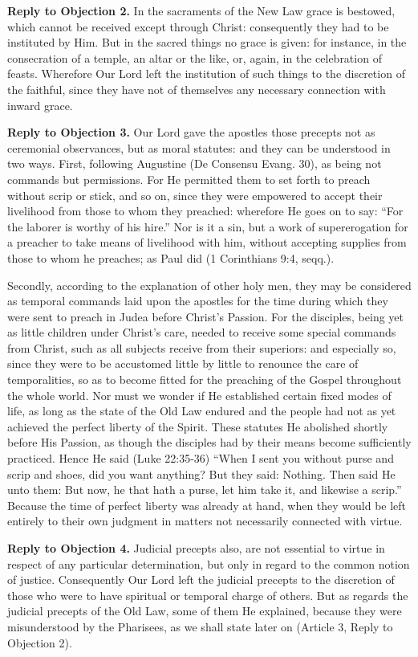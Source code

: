 \textbf{Reply to Objection 2.} In the sacraments of the New Law grace is bestowed, which cannot be received except through Christ: consequently they had to be instituted by Him. But in the sacred things no grace is given: for instance, in the consecration of a temple, an altar or the like, or, again, in the celebration of feasts. Wherefore Our Lord left the institution of such things to the discretion of the faithful, since they have not of themselves any necessary connection with inward grace.

\textbf{Reply to Objection 3.} Our Lord gave the apostles those precepts not as ceremonial observances, but as moral statutes: and they can be understood in two ways. First, following Augustine (De Consensu Evang. 30), as being not commands but permissions. For He permitted them to set forth to preach without scrip or stick, and so on, since they were empowered to accept their livelihood from those to whom they preached: wherefore He goes on to say: ``For the laborer is worthy of his hire.'' Nor is it a sin, but a work of supererogation for a preacher to take means of livelihood with him, without accepting supplies from those to whom he preaches; as Paul did (1 Corinthians 9:4, seqq.).

Secondly, according to the explanation of other holy men, they may be considered as temporal commands laid upon the apostles for the time during which they were sent to preach in Judea before Christ's Passion. For the disciples, being yet as little children under Christ's care, needed to receive some special commands from Christ, such as all subjects receive from their superiors: and especially so, since they were to be accustomed little by little to renounce the care of temporalities, so as to become fitted for the preaching of the Gospel throughout the whole world. Nor must we wonder if He established certain fixed modes of life, as long as the state of the Old Law endured and the people had not as yet achieved the perfect liberty of the Spirit. These statutes He abolished shortly before His Passion, as though the disciples had by their means become sufficiently practiced. Hence He said (Luke 22:35-36) ``When I sent you without purse and scrip and shoes, did you want anything? But they said: Nothing. Then said He unto them: But now, he that hath a purse, let him take it, and likewise a scrip.'' Because the time of perfect liberty was already at hand, when they would be left entirely to their own judgment in matters not necessarily connected with virtue.

\textbf{Reply to Objection 4.} Judicial precepts also, are not essential to virtue in respect of any particular determination, but only in regard to the common notion of justice. Consequently Our Lord left the judicial precepts to the discretion of those who were to have spiritual or temporal charge of others. But as regards the judicial precepts of the Old Law, some of them He explained, because they were misunderstood by the Pharisees, as we shall state later on (Article 3, Reply to Objection 2).

